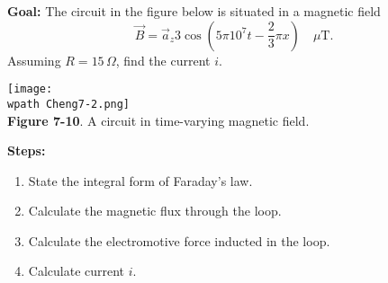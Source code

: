 \documentclass[../../header.tex]{subfiles}
\begin{document}
\textbf{Goal:} The circuit in the figure below is situated in a magnetic field
\begin{equation*}
\vec{B} = \vec{a}_z 3 \cos \left(5\pi 10^7 t - \frac{2}{3}\pi x\right) \quad \mu\text{T}.
\end{equation*}
Assuming $R = 15\,\Omega$, find the current $i$.
\begin{center}
\texttt{[image: \\wpath Cheng7-2.png]}\\
\textbf{Figure 7-10}. A circuit in time-varying magnetic field.
\end{center}
\textbf{Steps:} 
\begin{enumerate}
\item State the integral form of Faraday's law.


\item Calculate the magnetic flux through the loop.



\item Calculate the electromotive force inducted in the loop.


\item Calculate current $i$.


\end{enumerate}
\end{document}
